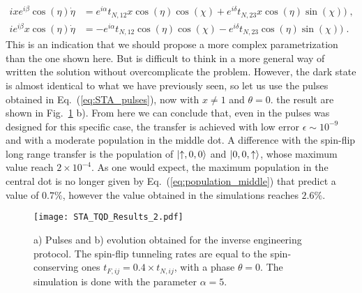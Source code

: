 \begin{equation}
	\begin{split}
	ixe^{i\beta}\cos(\eta)\dot{\eta}&=e^{i\alpha}t_{N,12}x\cos(\eta)\cos(\chi)+e^{i\delta}t_{N,23} x\cos(\eta)\sin(\chi))\; ,\\
	ie^{i\beta}x\cos(\eta)\dot{\eta}&=-e^{i\alpha}t_{N,12}\cos(\eta)\cos(\chi)-e^{i\delta}t_{N,23} \cos(\eta)\sin(\chi))\; .
	\end{split}
\end{equation}
This is an indication that we should propose a more complex parametrization than the one shown here. But is difficult to think in a more general way of written the solution without overcomplicate the problem. However, the dark state is almost identical to what we have previously seen, so let us use the pulses obtained in Eq.~(\ref{eq:STA_pulses}), now with $x\neq 1$ and $\theta=0$. the result are shown in Fig.~\ref{fig:STA_TQD_Results_2} b). From here we can conclude that, even in the pulses was designed for this specific case, the transfer is achieved with low error $\mathcal{\epsilon}\sim 10^{-9}$ and with a moderate population in the middle dot. A difference with the spin-flip long range transfer is the population of $\ket{\uparrow,0,0}$ and $\ket{0,0,\uparrow}$, whose maximum value reach $2\times10^{-4}$. As one would expect, the maximum population in the central dot is no longer given by Eq.~(\ref{eq:population_middle}) that predict a value of $0.7\%$, however the value obtained in the simulations reaches $2.6\%$.
\begin{figure}[!htb]
	\centering
	\texttt{[image: STA\_TQD\_Results\_2.pdf]}
	\caption{a) Pulses and b) evolution obtained for the inverse engineering protocol. The spin-flip tunneling rates are equal to the spin-conserving ones $t_{F,ij}=0.4\times t_{N,ij}$, with a phase $\theta=0$. The simulation is done with the parameter $\alpha=5$.}
	\label{fig:STA_TQD_Results_2}
\end{figure}

